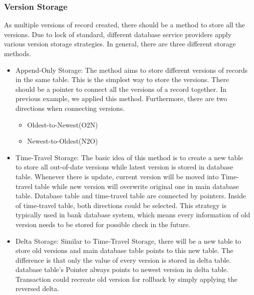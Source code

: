 \subsubsection{Version Storage}
As multiple versions of record created, there should be a method to store all the versions. Due to lock of standard, different database service providers apply various version storage strategies. In general, there are three different storage methods.
\begin{itemize}
	\item Append-Only Storage: The method aims to store different versions of records in the same table. This is the simplest way to store the versions. There should be a pointer to connect all the versions of a record together. In previous example, we applied this method. Furthermore, there are two directions when connecting versions.
	\begin{itemize}
		\item Oldest-to-Newest(O2N)
		\item Newest-to-Oldest(N2O)
	\end{itemize}
	\item Time-Travel Storage: The basic idea of this method is to create a new table to store all out-of-date versions while latest version is stored in database table. Whenever there is update, current version will be moved into Time-travel table while new version will overwrite original one in main database table. Database table and time-travel table are connected by pointers. Inside of time-travel table, both directions could be selected. This strategy is typically used in bank database system, which means every information of old version needs to be stored for possible check in the future. 
	\item Delta Storage: Similar to Time-Travel Storage, there will be a new table to store old versions and main database table points to this new table. The difference is that only the value of every version is stored in delta table. database table's Pointer always points to newest version in delta table. Transaction could recreate old version for rollback by simply applying the reversed delta. 
\end{itemize}
